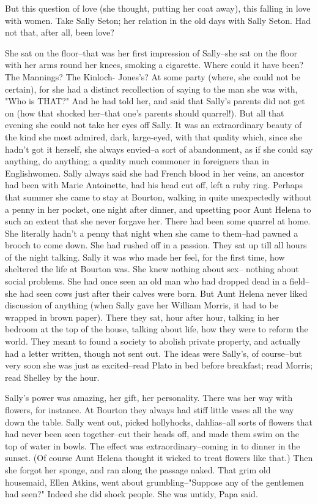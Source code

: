 \documentclass[lang=cn,10pt]{elegantbook}
\begin{document}
But this question of love (she thought, putting her coat away),
this falling in love with women.  Take Sally Seton; her relation in
the old days with Sally Seton.  Had not that, after all, been love?

She sat on the floor--that was her first impression of Sally--she
sat on the floor with her arms round her knees, smoking a
cigarette.  Where could it have been?  The Mannings?  The Kinloch-
Jones's?  At some party (where, she could not be certain), for she
had a distinct recollection of saying to the man she was with, "Who
is THAT?"  And he had told her, and said that Sally's parents did
not get on (how that shocked her--that one's parents should
quarrel!).  But all that evening she could not take her eyes off
Sally.  It was an extraordinary beauty of the kind she most
admired, dark, large-eyed, with that quality which, since she
hadn't got it herself, she always envied--a sort of abandonment, as
if she could say anything, do anything; a quality much commoner in
foreigners than in Englishwomen.  Sally always said she had French
blood in her veins, an ancestor had been with Marie Antoinette, had
his head cut off, left a ruby ring.  Perhaps that summer she came
to stay at Bourton, walking in quite unexpectedly without a penny
in her pocket, one night after dinner, and upsetting poor Aunt
Helena to such an extent that she never forgave her.  There had
been some quarrel at home.  She literally hadn't a penny that night
when she came to them--had pawned a brooch to come down.  She had
rushed off in a passion.  They sat up till all hours of the night
talking.  Sally it was who made her feel, for the first time, how
sheltered the life at Bourton was.  She knew nothing about sex--
nothing about social problems.  She had once seen an old man who
had dropped dead in a field--she had seen cows just after their
calves were born.  But Aunt Helena never liked discussion of
anything (when Sally gave her William Morris, it had to be wrapped
in brown paper).  There they sat, hour after hour, talking in her
bedroom at the top of the house, talking about life, how they were
to reform the world.  They meant to found a society to abolish
private property, and actually had a letter written, though not
sent out.  The ideas were Sally's, of course--but very soon she was
just as excited--read Plato in bed before breakfast; read Morris;
read Shelley by the hour.

Sally's power was amazing, her gift, her personality.  There was
her way with flowers, for instance.  At Bourton they always had
stiff little vases all the way down the table.  Sally went out,
picked hollyhocks, dahlias--all sorts of flowers that had never
been seen together--cut their heads off, and made them swim on the
top of water in bowls.  The effect was extraordinary--coming in to
dinner in the sunset.  (Of course Aunt Helena thought it wicked to
treat flowers like that.)  Then she forgot her sponge, and ran
along the passage naked.  That grim old housemaid, Ellen Atkins,
went about grumbling--"Suppose any of the gentlemen had seen?"
Indeed she did shock people.  She was untidy, Papa said.
\end{document}
